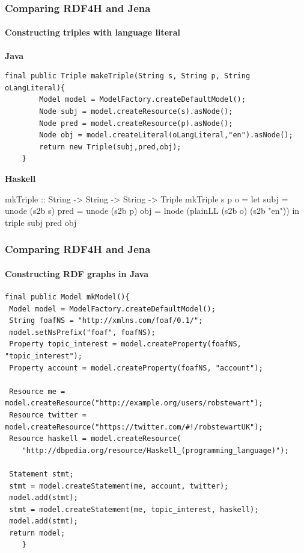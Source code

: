 \documentclass{beamer}
\begin{document}
\begin{frame}[fragile]
\frametitle{Comparing RDF4H and Jena}
\framesubtitle{Constructing triples with language literal}

\textbf{Java}

\begin{lstlisting}[style=MyJavaStyle]
final public Triple makeTriple(String s, String p, String oLangLiteral){
        Model model = ModelFactory.createDefaultModel();
        Node subj = model.createResource(s).asNode();
        Node pred = model.createResource(p).asNode();
        Node obj = model.createLiteral(oLangLiteral,"en").asNode();
        return new Triple(subj,pred,obj);
    }
\end{lstlisting}

\bigskip
\textbf{Haskell}

\begin{haskellcode}
mkTriple :: String -> String -> String -> Triple
mkTriple s p o = 
  let subj = unode (s2b s)
      pred = unode (s2b p)
      obj =  lnode (plainLL (s2b o) (s2b "en"))
  in triple subj pred obj
\end{haskellcode}

\end{frame}

\begin{frame}[fragile]
\frametitle{Comparing RDF4H and Jena}
\framesubtitle{Constructing RDF graphs in Java}


\begin{lstlisting}[style=MyJavaStyle,basicstyle=\scriptsize]
final public Model mkModel(){
 Model model = ModelFactory.createDefaultModel();
 String foafNS = "http://xmlns.com/foaf/0.1/";
 model.setNsPrefix("foaf", foafNS);
 Property topic_interest = model.createProperty(foafNS, "topic_interest");
 Property account = model.createProperty(foafNS, "account");

 Resource me = model.createResource("http://example.org/users/robstewart");
 Resource twitter = model.createResource("https://twitter.com/#!/robstewartUK");
 Resource haskell = model.createResource(
    "http://dbpedia.org/resource/Haskell_(programming_language)");

 Statement stmt;
 stmt = model.createStatement(me, account, twitter);
 model.add(stmt);
 stmt = model.createStatement(me, topic_interest, haskell);
 model.add(stmt);
 return model;
    }
\end{lstlisting}

\end{frame}
\end{document}
